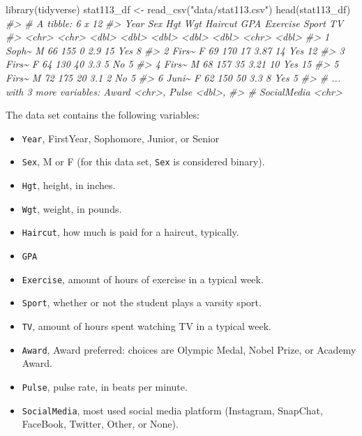 \documentclass[
]{book}
\newenvironment{Shaded}{\begin{snugshade}}{\end{snugshade}}
\newcommand{\CommentTok}[1]{\textcolor[rgb]{0.56,0.35,0.01}{\textit{#1}}}
\newcommand{\FunctionTok}[1]{\textcolor[rgb]{0.00,0.00,0.00}{#1}}
\newcommand{\NormalTok}[1]{#1}
\newcommand{\OtherTok}[1]{\textcolor[rgb]{0.56,0.35,0.01}{#1}}
\newcommand{\StringTok}[1]{\textcolor[rgb]{0.31,0.60,0.02}{#1}}
\providecommand{\tightlist}{%
  \setlength{\itemsep}{0pt}\setlength{\parskip}{0pt}}
\begin{document}
\begin{Shaded}
\begin{Highlighting}[]
\FunctionTok{library}\NormalTok{(tidyverse)}
\NormalTok{stat113\_df }\OtherTok{\textless{}{-}} \FunctionTok{read\_csv}\NormalTok{(}\StringTok{"data/stat113.csv"}\NormalTok{)}
\FunctionTok{head}\NormalTok{(stat113\_df)}
\CommentTok{\#\textgreater{} \# A tibble: 6 x 12}
\CommentTok{\#\textgreater{}   Year  Sex     Hgt   Wgt Haircut   GPA Exercise Sport    TV}
\CommentTok{\#\textgreater{}   \textless{}chr\textgreater{} \textless{}chr\textgreater{} \textless{}dbl\textgreater{} \textless{}dbl\textgreater{}   \textless{}dbl\textgreater{} \textless{}dbl\textgreater{}    \textless{}dbl\textgreater{} \textless{}chr\textgreater{} \textless{}dbl\textgreater{}}
\CommentTok{\#\textgreater{} 1 Soph\textasciitilde{} M        66   155       0  2.9        15 Yes       8}
\CommentTok{\#\textgreater{} 2 Firs\textasciitilde{} F        69   170      17  3.87       14 Yes      12}
\CommentTok{\#\textgreater{} 3 Firs\textasciitilde{} F        64   130      40  3.3         5 No        5}
\CommentTok{\#\textgreater{} 4 Firs\textasciitilde{} M        68   157      35  3.21       10 Yes      15}
\CommentTok{\#\textgreater{} 5 Firs\textasciitilde{} M        72   175      20  3.1         2 No        5}
\CommentTok{\#\textgreater{} 6 Juni\textasciitilde{} F        62   150      50  3.3         8 Yes       5}
\CommentTok{\#\textgreater{} \# ... with 3 more variables: Award \textless{}chr\textgreater{}, Pulse \textless{}dbl\textgreater{},}
\CommentTok{\#\textgreater{} \#   SocialMedia \textless{}chr\textgreater{}}
\end{Highlighting}
\end{Shaded}

The data set contains the following variables:

\begin{itemize}
\tightlist
\item
  \texttt{Year}, FirstYear, Sophomore, Junior, or Senior
\item
  \texttt{Sex}, M or F (for this data set, \texttt{Sex} is considered binary).
\item
  \texttt{Hgt}, height, in inches.
\item
  \texttt{Wgt}, weight, in pounds.
\item
  \texttt{Haircut}, how much is paid for a haircut, typically.
\item
  \texttt{GPA}
\item
  \texttt{Exercise}, amount of hours of exercise in a typical week.
\item
  \texttt{Sport}, whether or not the student plays a varsity sport.
\item
  \texttt{TV}, amount of hours spent watching TV in a typical week.
\item
  \texttt{Award}, Award preferred: choices are Olympic Medal, Nobel Prize, or Academy Award.
\item
  \texttt{Pulse}, pulse rate, in beats per minute.
\item
  \texttt{SocialMedia}, most used social media platform (Instagram, SnapChat, FaceBook, Twitter, Other, or None).
\end{itemize}
\end{document}
